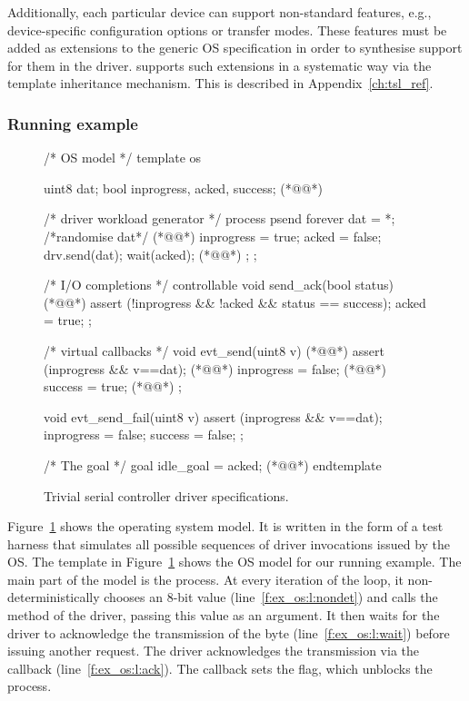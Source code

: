 Additionally, each particular device can support non-standard features, e.g., device-specific configuration options or transfer modes.  These features must be added as extensions to the generic OS specification in order to synthesise support for them in the driver.  \tsl supports such extensions in a systematic way via the template inheritance mechanism.  This is described in Appendix~\ref{ch:tsl_ref}.

\subsubsection{Running example}

\begin{figure}
\lstset{firstnumber=last}
\begin{tsllisting}[name=ex]
/* OS model */
template os 

    uint8 dat;
    bool inprogress, acked, success; (*@\label{f:ex_os:l:vars}@*)

    /* driver workload generator */
    process psend {
        forever {
            dat = *; /*randomise dat*/ (*@\label{f:ex_os:l:nondet}@*)
            inprogress = true;
            acked = false;
            drv.send(dat);
            wait(acked); (*@\label{f:ex_os:l:wait}@*)
        };
    };

    /* I/O completions */
    controllable void send_ack(bool status) { (*@\label{f:ex_os:l:ack}@*)
        assert (!inprogress && !acked && status == success);
        acked = true;
    };

    /* virtual callbacks */
    void evt_send(uint8 v) { (*@\label{f:ex_os:l:send_cb}@*)
        assert (inprogress && v==dat); (*@\label{f:ex_os:l:assert}@*)
        inprogress = false; (*@\label{f:ex_os:l:inprogress}@*)
        success = true; (*@\label{f:ex_os:l:success}@*)
    };

    void evt_send_fail(uint8 v) {
        assert (inprogress && v==dat);
        inprogress = false;
        success = false;
    };

    /* The goal */
    goal idle_goal = acked; (*@\label{f:ex_os:l:goal}@*)
endtemplate
\end{tsllisting}
\caption{Trivial serial controller driver specifications.}
\label{f:ex_os}
\end{figure}

Figure~\ref{f:ex_os} shows the operating system model. It is written in the form of a test harness that simulates all possible sequences of driver invocations issued by the OS\@.  The  template in Figure~\ref{f:ex_os} shows the OS model for our running example.  The main part of the model is the  process.  At every iteration of the loop, it non-deterministically chooses an 8-bit value (line~\ref{f:ex_os:l:nondet}) and calls the  method of the driver, passing this value as an argument.  It then waits for the driver to acknowledge the transmission of the byte (line~\ref{f:ex_os:l:wait}) before issuing another request.  The driver acknowledges the transmission via the  callback (line~\ref{f:ex_os:l:ack}).  The callback sets the  flag, which unblocks the  process.

